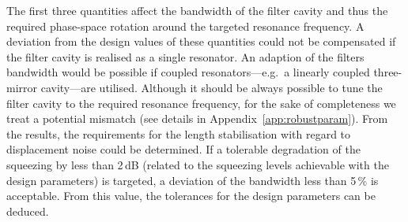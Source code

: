 The first three quantities affect the bandwidth of the filter cavity and thus the required phase-space rotation around the targeted resonance frequency. A deviation from the design values of these quantities could not be compensated if the filter cavity is realised as a single resonator. An adaption of the filters bandwidth would be possible if coupled resonators---e.g.\ a linearly coupled three-mirror cavity---are utilised.  Although it should be always possible to tune the filter cavity to the required resonance frequency, for the sake of completeness we treat a potential mismatch (see details in Appendix~\ref{app:robustparam}). From the results, the requirements for the length stabilisation with regard to displacement noise could be determined. 
If a tolerable  degradation  of the squeezing  by less than 2\,dB (related to the squeezing levels  achievable with  the  design parameters) is targeted, a deviation of the bandwidth less than 5\,\% is acceptable. From this value, the tolerances for the design parameters can be deduced. 


\FloatBarrier

